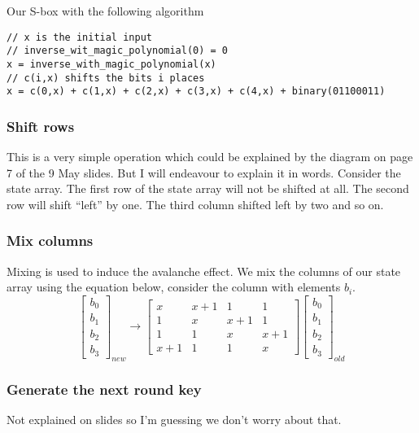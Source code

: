 \documentclass{report}
\begin{document}
Our S-box with the following algorithm
\begin{verbatim}
// x is the initial input
// inverse_wit_magic_polynomial(0) = 0
x = inverse_with_magic_polynomial(x)
// c(i,x) shifts the bits i places
x = c(0,x) + c(1,x) + c(2,x) + c(3,x) + c(4,x) + binary(01100011)
\end{verbatim}

\subsubsection{Shift rows}
This is a very simple operation which could be explained by the diagram on
page 7 of the 9 May slides. But I will endeavour to explain it in words.
Consider the state array. The first row of the state array will not be shifted
at all. The second row will shift ``left'' by one. The third column shifted
left by two and so on.

\subsubsection{Mix columns}
Mixing is used to induce the avalanche effect.
We mix the columns of our state array using the equation below,
consider the column with elements $b_i$.
\[
    \begin{bmatrix}
        b_0 \\
        b_1 \\
        b_2 \\
        b_3
    \end{bmatrix}_{new}
    \to
    \begin{bmatrix}
        x & x+1 & 1 & 1 \\
        1 & x & x+1 & 1 \\
        1 & 1 & x & x+1 \\
        x+1 & 1 & 1 & x
    \end{bmatrix}
    \begin{bmatrix}
        b_0 \\
        b_1 \\
        b_2 \\
        b_3
    \end{bmatrix}_{old}
\]

\subsubsection{Generate the next round key}
Not explained on slides so I'm guessing we don't worry about that.
\end{document}
